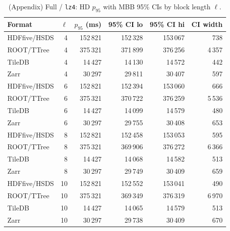 \documentclass[nomenclature, english, bibtex]{kththesis}
\numberwithin{listing}{chapter}
\begin{document}
\begin{table}[H]
  \centering
  \caption*{(Appendix) Full / \texttt{lz4}: \gls{HD} $p_{95}$ with \gls{MBB} 95\% \glspl{CI} by block length $\ell$.}
  \begin{tabular}{l r r r r r}
    \toprule
    Format & $\ell$ & $p_{95}$ (ms) & 95\% \gls{CI} lo & 95\% \gls{CI} hi & \gls{CI} width \\
    \midrule
    \gls{HDFfive}/\gls{HSDS} & 4  & 152\,821 & 152\,328 & 153\,067 & 738 \\
    \gls{ROOT}/\gls{TTree} & 4  & 375\,321 & 371\,899 & 376\,256 & 4\,357 \\
    TileDB & 4 & 14\,427  & 14\,130  & 14\,572  & 442 \\
    Zarr & 4  & 30\,297  & 29\,811  & 30\,407  & 597 \\
    \gls{HDFfive}/\gls{HSDS} & 6  & 152\,821 & 152\,394 & 153\,060 & 666 \\
    \gls{ROOT}/\gls{TTree} & 6  & 375\,321 & 370\,722 & 376\,259 & 5\,536 \\
    TileDB & 6 & 14\,427  & 14\,099  & 14\,579  & 480 \\
    Zarr & 6  & 30\,297  & 29\,755  & 30\,408  & 653 \\
    \gls{HDFfive}/\gls{HSDS} & 8  & 152\,821 & 152\,458 & 153\,053 & 595 \\
    \gls{ROOT}/\gls{TTree} & 8  & 375\,321 & 369\,906 & 376\,272 & 6\,366 \\
    TileDB & 8 & 14\,427  & 14\,068  & 14\,582  & 513 \\
    Zarr & 8  & 30\,297  & 29\,749  & 30\,409  & 659 \\
    \gls{HDFfive}/\gls{HSDS} & 10 & 152\,821 & 152\,552 & 153\,041 & 490 \\
    \gls{ROOT}/\gls{TTree} & 10 & 375\,321 & 369\,349 & 376\,319 & 6\,970 \\
    TileDB & 10& 14\,427  & 14\,065  & 14\,579  & 513 \\
    Zarr & 10 & 30\,297  & 29\,738  & 30\,409  & 670 \\
    \bottomrule
  \end{tabular}
\end{table}
\end{document}
